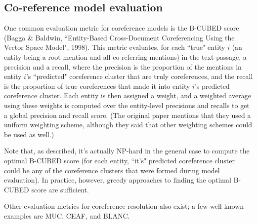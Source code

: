 \subsection{Co-reference model evaluation}
One common evaluation metric for coreference models is the B-CUBED score (Bagga \& Baldwin, ``Entity-Based Cross-Document Coreferencing Using the Vector Space Model", 1998). This metric evaluates, for each ``true" entity $i$ (an entity being a root mention and all co-referring mentions) in the text passage, a precision and a recall, where the precision is the proportion of the mentions in entity $i$'s ``predicted" coreference cluster that are truly coreferences, and the recall is the proportion of true coreferences that made it into entity $i$'s predicted coreference cluster. Each entity is then assigned a weight, and a weighted average using these weights is computed over the entity-level precisions and recalls to get a global precision and recall score. (The original paper mentions that they used a uniform weighting scheme, although they said that other weighting schemes could be used as well.)

Note that, as described, it's actually NP-hard in the general case to compute the optimal B-CUBED score (for each entity, ``it's" predicted coreference cluster could be any of the coreference clusters that were formed during model evaluation). In practice, however, greedy approaches to finding the optimal B-CUBED score are sufficient.

Other evaluation metrics for coreference resolution also exist; a few well-known examples are MUC, CEAF, and BLANC.

